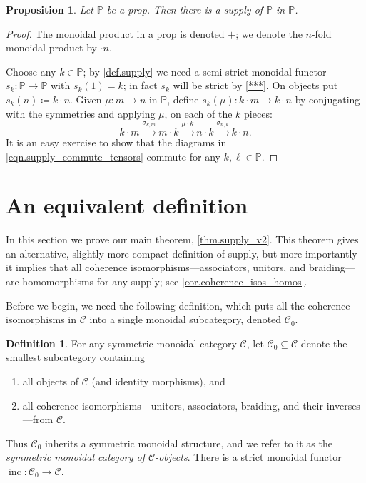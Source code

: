 \documentclass[11pt, oneside, article]{memoir}
\theoremstyle{plain}
\newtheorem{proposition}[theorem]{Proposition}
\theoremstyle{definition}
\newtheorem{definition}[theorem]{Definition}
\theoremstyle{remark}
\newcommand{\cat}[1]{\mathcal{#1}}%
\DeclareMathOperator{\inc}{inc}
\newcommand{\pp}{\mathbb{P}}
\newcommand{\mob}[1]{#1_0}
\newcommand{\To}[1]{\xrightarrow{#1}}
\renewcommand{\ss}{\subseteq}
\begin{document}
\begin{proposition}\label{prop.p_supplies_itself}
Let $\pp$ be a prop. Then there is a supply of $\pp$ in $\pp$.
\end{proposition}
\begin{proof}
The monoidal product in a prop is denoted $+$; we denote the $n$-fold monoidal product by $\cdot n$.

Choose any $k\in\pp$; by \cref{def.supply} we need a semi-strict monoidal functor $s_k\colon\pp\to\pp$ with $s_k(1)=k$; in fact $s_k$ will be strict by \cref{***}. On objects put $s_k(n)\coloneqq k\cdot n$. Given $\mu\colon m\to n$ in $\pp$, define $s_k(\mu)\colon k\cdot m\to k\cdot n$ by conjugating with the symmetries and applying $\mu$, on each of the $k$ pieces:
\begin{equation}\label{eqn.conjugation}
	k\cdot m\To{\sigma_{k,m}}
	m\cdot k\To{\mu\cdot k}
	n\cdot k\To{\sigma_{n,k}}
	k\cdot n.
\end{equation}
It is an easy exercise to show that the diagrams in \cref{eqn.supply_commute_tensors} commute for any $k,\ell\in\pp$.
\end{proof}
\section{An equivalent definition}\label{sec.main_thm}

In this section we prove our main theorem, \cref{thm.supply_v2}. This theorem gives an alternative, slightly more compact definition of supply, but more importantly it implies that all coherence isomorphisms---associators, unitors, and braiding---are homomorphisms for any supply; see \cref{cor.coherence_isos_homos}.

Before we begin, we need the following definition, which puts all the coherence isomorphisms in $\cat{C}$ into a single monoidal subcategory, denoted $\mob{\cat{C}}$.

\begin{definition}\label{def.mob}
For any symmetric monoidal category $\cat{C}$, let $\mob{\cat{C}}\ss\cat{C}$ denote the smallest subcategory containing
\begin{enumerate}[label=(\roman*)]
	\item all objects of $\cat{C}$ (and identity morphisms), and
	\item all coherence isomorphisms---unitors, associators, braiding, and their inverses---from $\cat{C}$.
\end{enumerate}
Thus $\mob{\cat{C}}$ inherits a symmetric monoidal structure, and we refer to it as the \emph{symmetric monoidal category of $\cat{C}$-objects}. There is a strict monoidal functor $\inc\colon\mob{\cat{C}}\to\cat{C}$. 
\end{definition}
\end{document}
